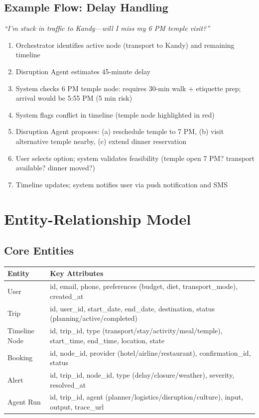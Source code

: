 \documentclass[11pt]{article}
\begin{document}
\subsection{Example Flow: Delay Handling}

\textit{``I'm stuck in traffic to Kandy—will I miss my 6 PM temple visit?''}

\begin{enumerate}
    \item Orchestrator identifies active node (transport to Kandy) and remaining timeline
    \item Disruption Agent estimates 45-minute delay
    \item System checks 6 PM temple node: requires 30-min walk + etiquette prep; arrival would be 5:55 PM (5 min risk)
    \item System flags conflict in timeline (temple node highlighted in red)
    \item Disruption Agent proposes: (a) reschedule temple to 7 PM, (b) visit alternative temple nearby, (c) extend dinner reservation
    \item User selects option; system validates feasibility (temple open 7 PM? transport available? dinner moved?)
    \item Timeline updates; system notifies user via push notification and SMS
\end{enumerate}

\section{Entity-Relationship Model}

\subsection{Core Entities}

\begin{table}[H]\centering\small
\begin{tabular}{|l|p{3.5in}|}
\hline
\textbf{Entity} & \textbf{Key Attributes} \\
\hline
User & id, email, phone, preferences (budget, diet, transport\_mode), created\_at \\
\hline
Trip & id, user\_id, start\_date, end\_date, destination, status (planning/active/completed) \\
\hline
Timeline Node & id, trip\_id, type (transport/stay/activity/meal/temple), start\_time, end\_time, location, state \\
\hline
Booking & id, node\_id, provider (hotel/airline/restaurant), confirmation\_id, status \\
\hline
Alert & id, trip\_id, node\_id, type (delay/closure/weather), severity, resolved\_at \\
\hline
Agent Run & id, trip\_id, agent (planner/logistics/disruption/culture), input, output, trace\_url \\
\hline
\end{tabular}
\end{table}
\end{document}
